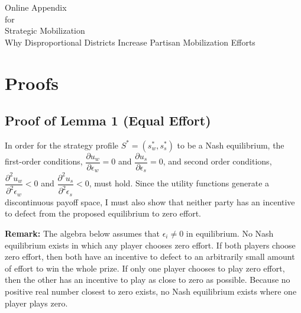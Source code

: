 \documentclass[12pt]{article}
\begin{document}
\begin{appendix}

\newpage


\begin{center}
{\LARGE Online Appendix}\\\vspace{2mm}
{for}\\\vspace{2mm}
{\Large Strategic Mobilization}\\\vspace{2mm}
{\large Why Disproportional Districts Increase Partisan Mobilization Efforts}\\
\end{center}


\tableofcontents

\section{Proofs}

\subsection{Proof of Lemma 1 (Equal Effort)}

In order for the strategy profile $ S^* = (s_w^*, s_s^*)$ to be a Nash equilibrium, the first-order conditions, $\dfrac{\partial u_w}{\partial \epsilon_w} = 0$ and $\dfrac{\partial u_s}{\partial \epsilon_s} = 0$, and second order conditions, $\dfrac{\partial ^2u_w}{\partial ^2\epsilon_w} < 0$ and $\dfrac{\partial ^2u_s}{\partial ^2\epsilon_s} < 0$, must hold. Since the utility functions generate a discontinuous payoff space, I must also show that neither party has an incentive to defect from the proposed equilibrium to zero effort.

\textbf{Remark:} The algebra below assumes that $\epsilon_i \neq 0$ in equilibrium. No Nash equilibrium exists in which any player chooses zero effort. If both players choose zero effort, then both have an incentive to defect to an arbitrarily small amount of effort to win the whole prize. If only one player chooses to play zero effort, then the other has an incentive to play as close to zero as possible. Because no positive real number closest to zero exists, no Nash equilibrium exists where one player plays zero.


\end{appendix}
\end{document}
